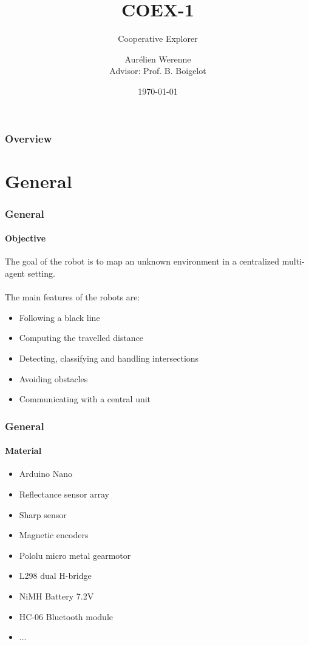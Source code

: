 \documentclass{beamer}
\title[Cooperative Explorer]{COEX-1} %
\subtitle{Cooperative Explorer}
\author[Aurélien Werenne]{Aurélien Werenne \\ {\small Advisor: Prof. B. Boigelot}}
\institute[ULiège] 
{
University of Liège \\ 
\medskip
}
\date{\today}
\begin{document}
\begin{frame}
\titlepage 
\end{frame}

\begin{frame}
\frametitle{Overview} 
\tableofcontents 
\end{frame}


\section{General} 

\begin{frame}
\frametitle{General}
\framesubtitle{Objective}
The goal of the robot is to map an unknown environment in a centralized multi-agent setting.\\~\\
The main features of the robots are:
\begin{itemize}
\item Following a black line
\item Computing the travelled distance
\item Detecting, classifying and handling intersections
\item Avoiding obstacles
\item Communicating with a central unit 
\end{itemize}
\end{frame}


\begin{frame}
\frametitle{General}
\framesubtitle{Material}
\begin{itemize}
\item Arduino Nano 
\item Reflectance sensor array 
\item Sharp sensor 
\item Magnetic encoders 
\item Pololu micro metal gearmotor 
\item L298 dual H-bridge 
\item NiMH Battery 7.2V 
\item HC-06 Bluetooth module 
\item ...
\end{itemize}
\end{frame}
\end{document}

